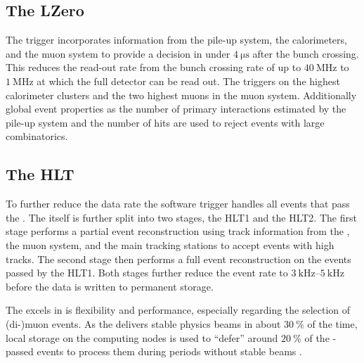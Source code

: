 \subsection{The \acl*{LZero}}
\label{sec:lhcb_experiment:trigger:lzero}

The \LZero trigger incorporates information from the \VELO pile-up system, the
calorimeters, and the muon system to provide a decision in under
$\SI{4}{\micro\second}$ after the bunch crossing. This reduces the read-out rate
from the \LHC bunch crossing rate of up to $\SI{40}{\mega\hertz}$ to
$\SI{1}{\mega\hertz}$ at which the full detector can be read out. The \LZero
triggers on the highest \ET calorimeter clusters and the two highest \pT muons
in the muon system. Additionally global event properties as the number of
primary \protonproton interactions estimated by the \VELO pile-up system and the
number of \SPD hits are used to reject events with large combinatorics.

\newpage
\subsection{The \acl*{HLT}}
\label{sec:lhcb_experiment:trigger:hlt}

To further reduce the data rate the \HLT software trigger handles all events
that pass the \LZero. The \HLT itself is further split into two stages, the
\acs{HLT}1 and the \acs{HLT}2. The first stage performs a partial event
reconstruction using track information from the \VELO, the muon system, and the
main tracking stations to accept events with high \pT tracks. The second \HLT
stage then performs a full event reconstruction on the events passed by the
\acs{HLT}1. Both \HLT stages further reduce the event rate to
$\SIrange[range-units = single, range-phrase = -]{3}{5}{\kilo\hertz}$ before the
data is written to permanent storage.

The \HLT excels in is flexibility and performance, especially regarding the
selection of (di-)muon events. As the \LHC delivers stable physics beams in
about $\SI{30}{\percent}$ of the time, local storage on the computing nodes is
used to \enquote{defer} around $\SI{20}{\percent}$ of the \LZero-passed events
to process them during periods without stable beams \cite{Frank:2014ixa}.

